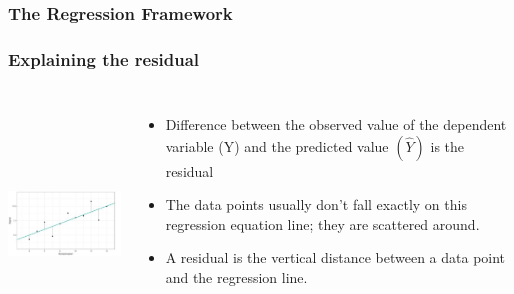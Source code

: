 \documentclass{beamer}
\begin{document}
\begin{frame}
\frametitle{The Regression Framework}

\end{frame}
\begin{frame}
\frametitle{Explaining the residual}
\begin{columns}
\includegraphics[width=6cm,height=6.5cm,keepaspectratio]{Example Res} 

\begin{itemize}
	\item Difference between the observed value of the dependent variable (Y) and the predicted value $(\hat{Y})$ is the residual
	\item The data points usually don’t fall exactly on this regression equation line; they are scattered around. 	
	\item A residual is the vertical distance between a data point and the regression line.
\end{itemize}
\end{columns}
\end{frame}
\end{document}
